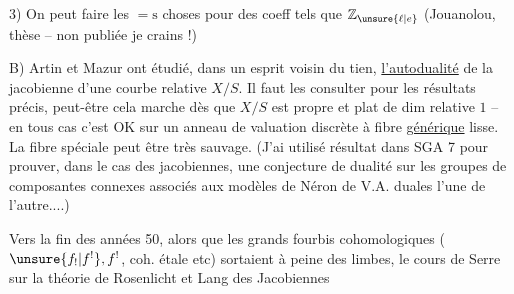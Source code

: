 3) On peut faire les ${=}\mathrm{s}$ choses pour des coeff tels que $\mathbb{Z}_{\unsure{\ell|e}}$ (Jouanolou, thèse -- non publiée je crains !)


B) Artin et Mazur ont étudié, dans un esprit voisin du tien, \uline{l'autodualité} de la jacobienne d'une courbe relative $X/S$. Il faut les consulter pour les résultats précis, peut-être cela marche dès que $X/S$ est propre et plat de dim relative $1$ -- en tous cas c'est OK sur un anneau de valuation discrète à fibre \uline{générique} lisse. La fibre spéciale peut être très sauvage. (J'ai utilisé  résultat dans SGA 7 pour prouver, dans le cas des jacobiennes, une conjecture de dualité sur les groupes de composantes connexes associés aux  modèles de Néron de V.A. duales l'une de l'autre....)


 Vers la fin des années 50, alors que les grands fourbis cohomologiques ($\unsure{f_{!}|f^{!}},f^{!}$, coh. étale etc) sortaient à peine des limbes, le cours de Serre sur la théorie de Rosenlicht et Lang des Jacobiennes
